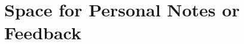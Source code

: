 \documentclass[a4paper,12pt,twoside]{memoir}
\begin{document}
%
%

%
%
%

\tableofcontents


%
%
%

%
%
%

%

%
%


%
%

\chapter{Space for Personal Notes or Feedback}
\clearpage

%
%
\myruledpage{0cm}{1cm}
\myruledpage{0cm}{1cm}
\myruledpage{0cm}{1cm}
\myruledpage{0cm}{1cm}
\end{document}
